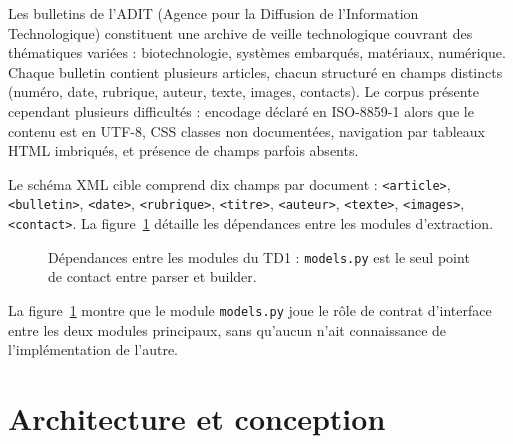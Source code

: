 Les bulletins de l'ADIT (Agence pour la Diffusion de l'Information Technologique)
constituent une archive de veille technologique couvrant des thématiques variées :
biotechnologie, systèmes embarqués, matériaux, numérique. Chaque bulletin contient
plusieurs articles, chacun structuré en champs distincts (numéro, date, rubrique,
auteur, texte, images, contacts). Le corpus présente cependant plusieurs difficultés :
encodage déclaré en ISO-8859-1 alors que le contenu est en UTF-8, CSS classes non
documentées, navigation par tableaux HTML imbriqués, et présence de champs parfois absents.

Le schéma XML cible comprend dix champs par document : \texttt{<article>},
\texttt{<bulletin>}, \texttt{<date>}, \texttt{<rubrique>}, \texttt{<titre>},
\texttt{<auteur>}, \texttt{<texte>}, \texttt{<images>}, \texttt{<contact>}.
La figure~\ref{fig:architecture_td1} détaille les dépendances entre les modules
d'extraction.

\begin{figure}[ht]
  \centering
  \caption{Dépendances entre les modules du TD1 : \texttt{models.py} est le seul point
    de contact entre parser et builder.}
  \label{fig:architecture_td1}
\end{figure}

La figure~\ref{fig:architecture_td1} montre que le module \texttt{models.py} joue le
rôle de contrat d'interface entre les deux modules principaux, sans qu'aucun n'ait
connaissance de l'implémentation de l'autre.

\section{Architecture et conception}

